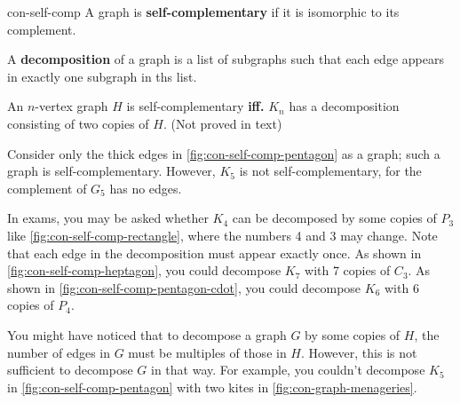 \documentclass[../src/handouts/main.tex]{subfiles}
\begin{document}
\begin{definition}{}{con-self-comp}
  A graph is \textbf{self-complementary} if it is isomorphic to its complement.

  A \textbf{decomposition} of a graph is a list of subgraphs such that each edge appears in exactly one subgraph in ths list.

  An $n$-vertex graph $H$ is self-complementary \textbf{iff.} $K_n$ has a decomposition consisting of two copies of $H$. (Not proved in text)
\end{definition}

Consider only the thick edges in \cref{fig:con-self-comp-pentagon} as a graph; such a graph is self-complementary. However, $K_5$ is not self-complementary, for the complement of $G_5$ has no edges.

In exams, you may be asked whether $K_4$ can be decomposed by some copies of $P_3$ like \cref{fig:con-self-comp-rectangle}, where the numbers 4 and 3 may change. Note that each edge in the decomposition must appear exactly once. As shown in \cref{fig:con-self-comp-heptagon}, you could decompose $K_7$ with 7 copies of $C_3$. As shown in \cref{fig:con-self-comp-pentagon-cdot}, you could decompose $K_6$ with 6 copies of $P_4$.

You might have noticed that to decompose a graph $G$ by some copies of $H$, the number of edges in $G$ must be multiples of those in $H$. However, this is not sufficient to decompose $G$ in that way. For example, you couldn't decompose $K_5$ in \cref{fig:con-self-comp-pentagon} with two kites in \cref{fig:con-graph-menageries}.
\end{document}
